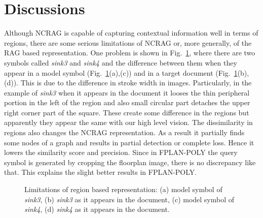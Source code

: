\section{Discussions}
\label{sec:ncrag:disc}
Although NCRAG is capable of capturing contextual information well in terms of regions, there are some serious limitations of NCRAG or, more generally, of the RAG based representation. One problem is shown in Fig.~\ref{fig:ncrag:limitations}, where there are two symbols called \textit{sink3} and \textit{sink4} and the difference between them when they appear in a model symbol (Fig.~\ref{fig:ncrag:limitations}(a),(c)) and in a target document (Fig.~\ref{fig:ncrag:limitations}(b),(d)). This is due to the difference in stroke width in images. Particularly, in the example of \textit{sink3} when it appears in the document it looses the thin peripheral portion in the left of the region and also small circular part detaches the upper right corner part of the square. These create some difference in the regions but apparently they appear the same with our high level vision. The dissimilarity in regions also changes the NCRAG representation. As a result it partially finds some nodes of a graph and results in partial detection or complete loss. Hence it lowers the similarity score and precision. Since in FPLAN-POLY the query symbol is generated by cropping the floorplan image, there is no discrepancy like that. This explains the slight better results in FPLAN-POLY.
\begin{figure}[!h]
\centering  
{}
\hspace{1mm}
\hspace{1mm}
\hspace{1mm}
\caption{Limitations of region based representation: (a) model symbol of \textit{sink3}, (b) \textit{sink3} as it appears in the document, (c) model symbol of \textit{sink4}, (d) \textit{sink4} as it appears in the document.}
\label{fig:ncrag:limitations}
\end{figure}

